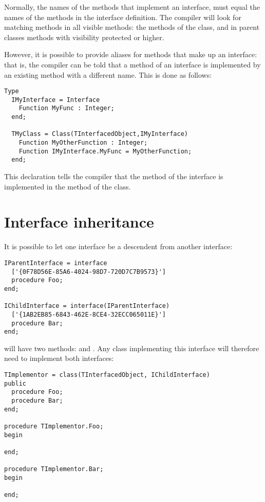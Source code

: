 Normally, the names of the methods that implement an interface, must
equal the names of the methods in the interface definition. The compiler
will look for matching methods in all visible methods: the methods of the
class, and in parent classes methods with visibility protected or higher. 

However, it is possible to provide aliases for methods that make up an
interface: that is, the compiler can be told that a method of an interface
is implemented by an existing method with a different name.
This is done as follows:
\begin{verbatim}
Type
  IMyInterface = Interface
    Function MyFunc : Integer;
  end;

  TMyClass = Class(TInterfacedObject,IMyInterface)
    Function MyOtherFunction : Integer;
    Function IMyInterface.MyFunc = MyOtherFunction;
  end;
\end{verbatim}
This declaration tells the compiler that the  method of
the  interface is implemented in the 
method of the  class.

\section{Interface inheritance}
It is possible to let one interface be a descendent from another interface:
\begin{verbatim}
IParentInterface = interface
  ['{0F78D56E-85A6-4024-98D7-720D7C7B9573}']
  procedure Foo;
end;

IChildInterface = interface(IParentInterface)
  ['{1AB2EB85-6843-462E-8CE4-32ECC065011E}']
  procedure Bar;
end;
\end{verbatim}
 will have two methods:  and .
Any class implementing this interface will therefore need to implement both interfaces:
\begin{verbatim}
TImplementor = class(TInterfacedObject, IChildInterface)
public
  procedure Foo;
  procedure Bar;
end;

procedure TImplementor.Foo;
begin

end;

procedure TImplementor.Bar;
begin

end;
\end{verbatim}

